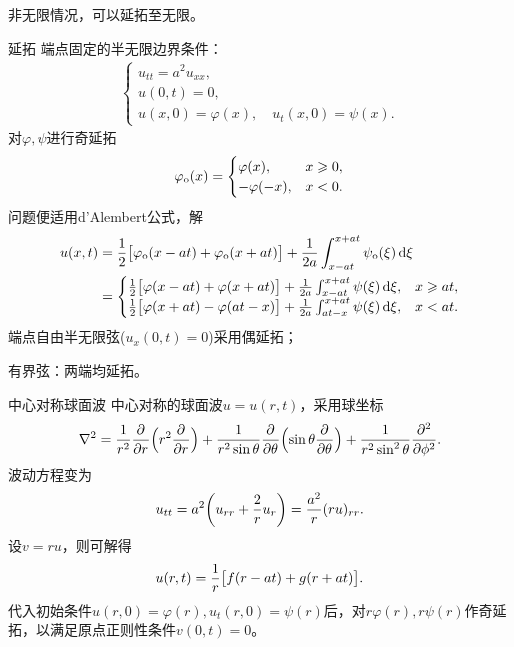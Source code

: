 非无限情况，可以延拓至无限。
\begin{example}{延拓}{}
	端点固定的半无限边界条件：
	\begin{align*}
		\begin{cases}
			u_{tt} = a^2u_{xx},\\
			u(0,t) = 0,\\
			u(x,0) = \varphi(x),\quad u_t(x,0) = \psi(x).
		\end{cases}
	\end{align*}
	对$\varphi,\psi$进行奇延拓
	\begin{align*}
		\varphi_\odd(x) =
		\begin{cases}
			\varphi(x),   & x \geqslant 0, \\
			-\varphi(-x), & x < 0.
		\end{cases}
	\end{align*}
	问题便适用d'Alembert公式，解
	\begin{align*}
		u(x,t) & = \frac12\bigb{\varphi_\odd(x - at) + \varphi_\odd(x + at)} + \frac1{2a}\int_{x-at}^{x+at}\psi_\odd(\xi)\d\xi \\
			   & = 
		\begin{cases}
			\frac12\bigb{\varphi(x - at) + \varphi(x + at)} + \frac1{2a}\int_{x-at}^{x+at}\psi(\xi)\d\xi, & x \geqslant at, \\
			\frac12\bigb{\varphi(x + at) - \varphi(at - x)} + \frac1{2a}\int_{at-x}^{x+at}\psi(\xi)\d\xi, & x < at.
		\end{cases}
	\end{align*}
	\tcblower
	端点自由半无限弦($u_x(0,t) = 0$)采用偶延拓；
	
	有界弦：两端均延拓。
\end{example}
\begin{example}{中心对称球面波}{}
	中心对称的球面波$u = u(r,t)$，采用球坐标
	\[
		\laplacian = \frac1{r^2}\pp r\Bigp{r^2\pp r} + \frac1{r^2\sin\theta}\pp \theta\Bigp{\sin\theta\pp \theta} + \frac1{r^2\sin^2\theta}\pp[2]\phi.
	\]
	波动方程变为
	\[
		u_{tt} = a^2\biggp{u_{rr} + \frac2ru_r} = \frac{a^2}r(ru)_{rr}.
	\]
	设$v = ru$，则可解得
	\begin{equation}
		\label{eq:mmp-spherical-waves}
		u(r,t) = \frac1r\bigb{f(r - at) + g(r + at)}.
	\end{equation}
	代入初始条件$u(r,0) = \varphi(r),u_t(r,0) = \psi(r)$后，对$r\varphi(r),r\psi(r)$作奇延拓，以满足原点正则性条件$v(0,t) = 0$。
\end{example}
